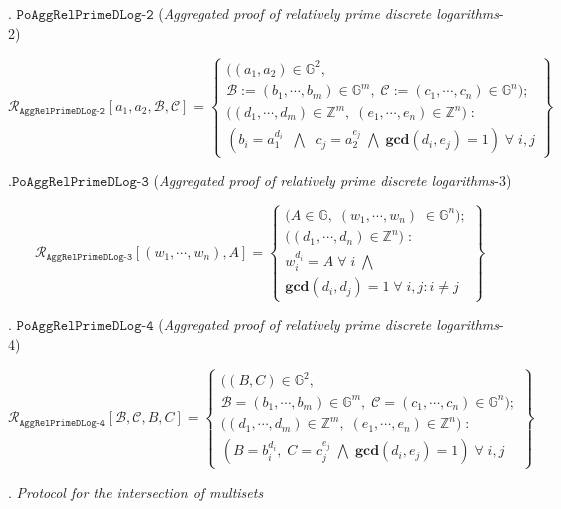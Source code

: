 \documentclass[11pt, lettersize, notitlepage, leqno, footskip=0.6cm]{article}
\newcommand{\bz}{\mathbb Z}
\newcommand{\ttt}{\texttt}
\newcommand{\mc}{\mathcal}
\newcommand{\mb}{\mathbb}
\newcommand{\mbf}{\mathbf}
\newcommand{\noin}{\noindent}
\newcommand{\GCD}{\mbf{gcd}}
\numberwithin{equation}{section}
\begin{document}
{\noin 11. $\ttt{PoAggRelPrimeDLog-2}$ (\textit{Aggregated proof of relatively prime discrete logarithms}-2) \vspace{-0.6cm}

\[
  \mc{R}_{{\ttt{AggRelPrimeDLog-2}}}[a_1, a_2, \mc{B}, \mc{C}] = \left\{\begin{array}{l}
    \big((a_1,a_2)\in\mb{G}^2,\;\\
     \mc{B}:=(b_1,\cdots, b_m)\in\mb{G}^m,\;\mc{C}:= (c_1,\cdots, c_n)\in\mb{G}^n);\\
    ((d_1,\cdots,d_m)\in\bz^m,\; (e_1,\cdots,e_n)\in\bz^n\big)\;: \\
    (b_i = a_1^{d_i}\;\;\bigwedge\;\; c_j = a_2^{e_j}\;\bigwedge\; \GCD(d_i, e_j) = 1)\;\forall \;i,j   	
  \end{array}\right\}
\] 

\noin 12.${\ttt{PoAggRelPrimeDLog-3}}$ (\textit{Aggregated proof of relatively prime discrete logarithms}-3) \vspace{-0.3cm}

\[
  \mc{R}_{{\ttt{AggRelPrimeDLog-3}}}[(w_1,\cdots, w_n), A] = \left\{\begin{array}{l}
    \big(A\in\mb{G},\; (w_1,\cdots, w_n)\;\in\mb{G}^n);\\
    ((d_1,\cdots,d_n)\in\bz^n\big)\;: \\
    w_i^{d_i} = A\;\forall\;i\;\bigwedge  \\
   	\GCD(d_i, d_j) = 1\;\forall \;i,j: i\neq j
  \end{array}\right\}
\] 

\noin 13. ${\ttt{PoAggRelPrimeDLog-4}}$ (\textit{Aggregated proof of relatively prime discrete logarithms}-4) \vspace{-0.5cm}

\[
  \mc{R}_{{\ttt{AggRelPrimeDLog-4}}}[\mc{B}, \mc{C}, B, C] = \left\{\begin{array}{l}
    \big((B,C)\in\mb{G}^2,\;\\
     \mc{B} = (b_1,\cdots,b_m)\in\mb{G}^m,\;\mc{C} = (c_1,\cdots, c_n)\in\mb{G}^n);\\
    ((d_1,\cdots,d_m)\in\bz^m,\; (e_1,\cdots,e_n)\in\bz^n\big)\;: \\
    (B = b_i^{d_i},\; C = c_j^{e_j}\;\bigwedge \; \GCD(d_i, e_j) = 1)\;\forall \;i,j
  \end{array}\right\}
\]   

\noin 14. \textit{Protocol for the intersection of multisets} \vspace{-0.3cm}

}
\end{document}
